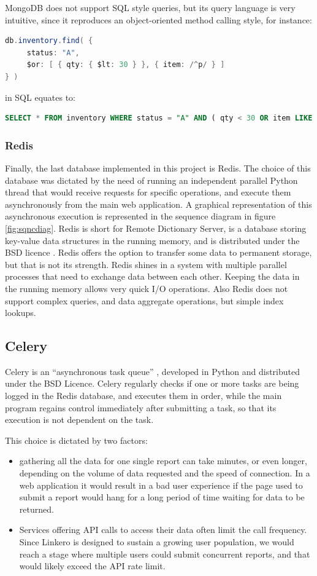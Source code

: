 MongoDB does not support SQL style queries, but its query language is very
intuitive, since it reproduces an object-oriented method calling style, for
instance:
\begin{lstlisting}[language=Java, breaklines=true]
db.inventory.find( {
     status: "A",
     $or: [ { qty: { $lt: 30 } }, { item: /^p/ } ]
} )
\end{lstlisting}
in SQL equates to:
\begin{lstlisting}[language=SQL, breaklines=true]
SELECT * FROM inventory WHERE status = "A" AND ( qty < 30 OR item LIKE "p%")
\end{lstlisting}

\subsubsection{Redis}
Finally, the last database implemented in this project is Redis\texttrademark.
The choice of this database was dictated by the need of running an independent
parallel Python thread that would receive requests for specific operations,
and execute them asynchronously from the main web application. A graphical
representation of this asynchronous execution is represented in the sequence
diagram in figure \ref{fig:sqncdiag}. Redis is short for Remote Dictionary
Server, is a database storing key-value data structures in the running
memory, and is distributed under the BSD licence \cite{Redis}. Redis offers the
option to transfer some data to permanent storage, but that is not its strength.
Redis shines in a system with multiple parallel processes that need to
exchange data between each other. Keeping the data in the running memory allows
very quick I/O operations. Also Redis does not support complex queries, and data
aggregate operations, but simple index lookups.

\subsection{Celery}
Celery is an ``asynchronous task queue'' \cite{Celery}, developed in Python and
distributed under the BSD Licence. Celery regularly checks if one or more tasks
are being logged in the Redis database, and executes them in order, while the
main program regains control immediately after submitting a task, so that its
execution is not dependent on the task.

This choice is dictated by two factors:
\begin{itemize}
  \item gathering all the data for one single report can take minutes, or even
  longer, depending on the volume of data requested and the speed of connection.
  In a web application it would result in a bad user experience if the page used
  to submit a report would hang for a long period of time waiting for data to be
  returned.
  \item Services offering API calls to access their data often limit the call
  frequency. Since Linkero is designed to sustain a growing user population,
  we would reach a stage where multiple users could submit concurrent reports,
  and that would likely exceed the API rate limit.
\end{itemize}

